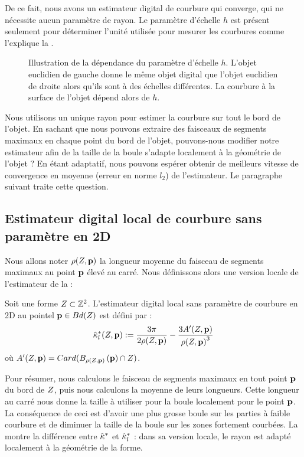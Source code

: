 De ce fait, nous avons un estimateur digital de courbure qui converge, qui ne
nécessite aucun paramètre de rayon. Le paramètre d'échelle $h$ est présent
seulement pour déterminer l'unité utilisée pour mesurer les courbures comme
l'explique la .

\begin{figure}[ht]
  \begin{center}
    
  \end{center}
  \caption[Illustration de la dépendance du paramètre d'échelle $h$.]
  {Illustration de la dépendance du paramètre d'échelle $h$. L'objet euclidien
  de gauche donne le même objet digital que l'objet euclidien de droite alors
  qu'ils sont à des échelles différentes. La courbure à la surface de l'objet
  dépend alors de $h$.\label{fig:2d-parameter-free-explained}}
\end{figure}

Nous utilisons un unique rayon pour estimer la courbure sur tout le bord de
l'objet. En sachant que nous pouvons extraire des faisceaux de segments maximaux
en chaque point du bord de l'objet, pouvons-nous modifier notre estimateur afin
de la taille de la boule s'adapte localement à la géométrie de l'objet ? En
étant adaptatif, nous pouvons espérer obtenir de meilleurs vitesse de
convergence en moyenne (erreur en norme $l_2$) de l'estimateur. Le paragraphe
suivant traite cette question.

\subsection{Estimateur digital local de courbure sans paramètre en 2D}

Nous allons noter $\rho(Z,\mathbf{p})$ la longueur moyenne du faisceau de
segments maximaux au point $\mathbf{p}$ élevé au carré. Nous définissons alors une
version locale de l'estimateur de la
 :
%
\begin{definition}
  Soit une forme $Z \subset \mathbb{Z}^2$. L'estimateur digital local sans
  paramètre de courbure en 2D au pointel $\mathbf{p} \in Bd({Z})$ est défini par :
  \begin{equation}
    \hat{\kappa}^{*}_{l}(Z, \mathbf{p}) := \frac{3\pi}{2 \rho(Z,\mathbf{p})} - \frac{3 A'(Z,\mathbf{p})}{{\rho(Z,\mathbf{p})}^3}
  \end{equation}
  où $A'(Z, \mathbf{p}) = Card(B_{\rho(Z,\mathbf{p})}\left(\mathbf{p}\right) \cap
  Z)$.
\end{definition}
%
Pour résumer, nous calculons le faisceau de segments maximaux en tout point
$\mathbf{p}$ du bord de $Z$, puis nous calculons la moyenne de leurs longueurs.
Cette longueur au carré nous donne la taille à utiliser pour la boule localement
pour le point $\mathbf{p}$. La conséquence de ceci est d'avoir une plus grosse boule
sur les parties à faible courbure et de diminuer la taille de la boule sur les
zones fortement courbées. La  montre la
différence entre $\hat{\kappa}^{*}$ et $\hat{\kappa}^{*}_{l}$ : dans sa version locale, le rayon est
adapté localement à la géométrie de la forme.

